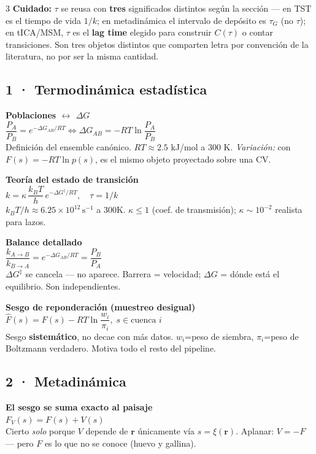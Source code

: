 \documentclass[9pt]{extarticle}
\newcommand{\F}[2]{%
  \par\noindent\textbf{\color{miazul}#1}\\[-0.15em]
  #2\\[0.35em]
}
\begin{document}
\begin{multicols}{3}
\vspace{0.3em}
{\scriptsize\color{minaranja}\textbf{Cuidado:} $\tau$ se reusa con \textbf{tres} significados distintos según la sección — en TST es el tiempo de vida $1/k$; en metadinámica el intervalo de depósito es $\tau_G$ (no $\tau$); en tICA/MSM, $\tau$ es el \textbf{lag time} elegido para construir $C(\tau)$ o contar transiciones. Son tres objetos distintos que comparten letra por convención de la literatura, no por ser la misma cantidad.}

\subsection*{\small 1 · Termodinámica estadística}

\F{Poblaciones $\leftrightarrow$ $\Delta G$}{
$\dfrac{P_A}{P_B}=e^{-\Delta G_{AB}/RT} \Leftrightarrow \Delta G_{AB}=-RT\ln\dfrac{P_A}{P_B}$\\
{\scriptsize Definición del ensemble canónico. $RT\approx2.5$ kJ/mol a 300 K. \emph{Variación:} con $F(s)=-RT\ln p(s)$, es el mismo objeto proyectado sobre una CV.}}

\F{Teoría del estado de transición}{
$k=\kappa\,\dfrac{k_BT}{h}\,e^{-\Delta G^{\ddagger}/RT}, \quad \tau=1/k$\\
{\scriptsize $k_BT/h\approx6.25\times10^{12}\,\text{s}^{-1}$ a 300K. $\kappa\le1$ (coef. de transmisión); $\kappa\sim10^{-2}$ realista para lazos.}}

\F{Balance detallado}{
$\dfrac{k_{A\to B}}{k_{B\to A}}=e^{-\Delta G_{AB}/RT}=\dfrac{P_B}{P_A}$\\
{\scriptsize $\Delta G^{\ddagger}$ se cancela — no aparece. Barrera = velocidad; $\Delta G$ = dónde está el equilibrio. Son independientes.}}

\F{Sesgo de reponderación (muestreo desigual)}{
$\hat F(s)=F(s)-RT\ln\dfrac{w_i}{\pi_i}, \; s\in\text{cuenca }i$\\
{\scriptsize Sesgo \textbf{sistemático}, no decae con más datos. $w_i$=peso de siembra, $\pi_i$=peso de Boltzmann verdadero. Motiva todo el resto del pipeline.}}

\subsection*{\small 2 · Metadinámica}

\F{El sesgo se suma exacto al paisaje}{
$F_V(s)=F(s)+V(s)$\\
{\scriptsize Cierto \emph{solo} porque $V$ depende de $\mathbf{r}$ únicamente vía $s=\xi(\mathbf{r})$. Aplanar: $V=-F$ — pero $F$ es lo que no se conoce (huevo y gallina).}}


\end{multicols}
\end{document}

